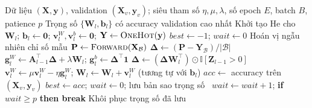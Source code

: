 \begin{algorithm}[H]
\caption{Huấn luyện MLP bằng mini-batch SGD + momentum và early stopping ()}
\label{alg:mlp}
\small
\begin{algorithmic}[1]
\Require Dữ liệu $(\mathbf{X},\mathbf{y})$, validation $(\mathbf{X}_v,\mathbf{y}_v)$; siêu tham số $\eta,\mu,\lambda$, số epoch $E$, batch $B$, patience $p$
\Ensure Trọng số $\{\mathbf{W}_l,\mathbf{b}_l\}$ có accuracy validation cao nhất
\State Khởi tạo He cho $\mathbf{W}_l$; $\mathbf{b}_l\gets\mathbf{0}$; $\mathbf{v}^W_l,\mathbf{v}^b_l\gets\mathbf{0}$; $\mathbf{Y}\gets\textsc{OneHot}(\mathbf{y})$
\State $best\gets-1$; $wait\gets 0$
  \State Hoán vị ngẫu nhiên chỉ số mẫu
    \State $\mathbf{P}\gets\textsc{Forward}(\mathbf{X}_{\mathcal{B}})$ 
    \State $\bm{\Delta}\gets(\mathbf{P}-\mathbf{Y}_{\mathcal{B}})/|\mathcal{B}|$
      \State $\mathbf{g}^W_l\gets\mathbf{A}_{l-1}^{\top}\bm{\Delta}+\lambda\mathbf{W}_l$; \quad $\mathbf{g}^b_l\gets\bm{\Delta}^{\top}\mathbf{1}$
       $\bm{\Delta}\gets(\bm{\Delta}\mathbf{W}_l^{\top})\odot\mathbb{I}[\mathbf{Z}_{l-1}>0]$ \EndIf
    \EndFor
     
      \State $\mathbf{v}^W_l\gets\mu\mathbf{v}^W_l-\eta\mathbf{g}^W_l$; \quad $\mathbf{W}_l\gets\mathbf{W}_l+\mathbf{v}^W_l$ \quad (tương tự với $\mathbf{b}_l$)
    \EndFor
  \EndFor
  \State $acc\gets$ accuracy trên $(\mathbf{X}_v,\mathbf{y}_v)$
   $best\gets acc$; $wait\gets0$; lưu bản sao trọng số
  \Else\ $wait\gets wait+1$; \textbf{if} $wait\ge p$ \textbf{then break}
  \EndIf
\EndFor
\State Khôi phục trọng số đã lưu
\end{algorithmic}
\end{algorithm}


